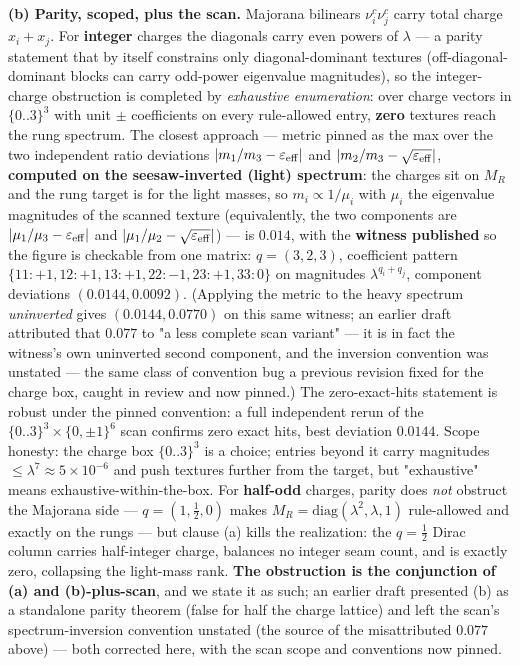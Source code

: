 \documentclass[11pt]{article}
\begin{document}
\textbf{(b) Parity, scoped, plus the scan.}  Majorana bilinears $\nu^c_i\nu^c_j$ carry total charge $x_i + x_j$.  For \textbf{integer} charges the diagonals carry even powers of $\lambda$ — a parity statement that by itself constrains only diagonal-dominant textures (off-diagonal-dominant blocks can carry odd-power eigenvalue magnitudes), so the integer-charge obstruction is completed by \emph{exhaustive enumeration}: over charge vectors in $\{0..3\}^3$ with unit $\pm$ coefficients on every rule-allowed entry, \textbf{zero} textures reach the rung spectrum.  The closest approach — metric pinned as the max over the two independent ratio deviations $|m_1/m_3 - \varepsilon_{\rm eff}|$ and $|m_2/m_3 - \sqrt{\varepsilon_{\rm eff}}|$, \textbf{computed on the seesaw-inverted (light) spectrum}: the charges sit on $M_R$ and the rung target is for the light masses, so $m_i \propto 1/\mu_i$ with $\mu_i$ the eigenvalue magnitudes of the scanned texture (equivalently, the two components are $|\mu_1/\mu_3 - \varepsilon_{\rm eff}|$ and $|\mu_1/\mu_2 - \sqrt{\varepsilon_{\rm eff}}|$) — is $0.014$, with the \textbf{witness published} so the figure is checkable from one matrix: $q = (3,2,3)$, coefficient pattern $\{11{:}{+}1, 12{:}{+}1, 13{:}{+}1, 22{:}{-}1, 23{:}{+}1, 33{:}0\}$ on magnitudes $\lambda^{q_i+q_j}$, component deviations $(0.0144, 0.0092)$. (Applying the metric to the heavy spectrum \emph{uninverted} gives $(0.0144, 0.0770)$ on this same witness; an earlier draft attributed that $0.077$ to "a less complete scan variant" — it is in fact the witness's own uninverted second component, and the inversion convention was unstated — the same class of convention bug a previous revision fixed for the charge box, caught in review and now pinned.)  The zero-exact-hits statement is robust under the pinned convention: a full independent rerun of the $\{0..3\}^3 \times \{0,\pm1\}^6$ scan confirms zero exact hits, best deviation $0.0144$.  Scope honesty: the charge box $\{0..3\}^3$ is a choice; entries beyond it carry magnitudes $\le \lambda^7 \approx 5\times 10^{-6}$ and push textures further from the target, but "exhaustive" means exhaustive-within-the-box.  For \textbf{half-odd} charges, parity does \emph{not} obstruct the Majorana side — $q = (1, \tfrac12, 0)$ makes $M_R = \mathrm{diag}(\lambda^2, \lambda, 1)$ rule-allowed and exactly on the rungs — but clause (a) kills the realization: the $q = \tfrac12$ Dirac column carries half-integer charge, balances no integer seam count, and is exactly zero, collapsing the light-mass rank.  \textbf{The obstruction is the conjunction of (a) and (b)-plus-scan}, and we state it as such; an earlier draft presented (b) as a standalone parity theorem (false for half the charge lattice) and left the scan's spectrum-inversion convention unstated (the source of the misattributed $0.077$ above) — both corrected here, with the scan scope and conventions now pinned.
\end{document}
